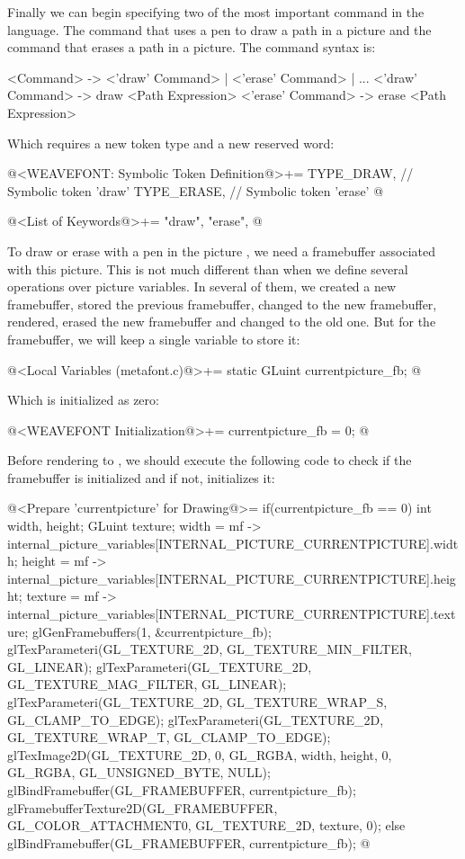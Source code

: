 {{{{{Finally we can begin specifying two of the most important command in
the language. The command that uses a pen to draw a path in a picture
and the command that erases a path in a picture. The command syntax
is:

\alinhaverbatim
<Command> -> <'draw' Command> | <'erase' Command> | ...
<'draw' Command> -> draw <Path Expression>
<'erase' Command> -> erase <Path Expression>
\alinhanormal

Which requires a new token type and a new reserved word:

\iniciocodigo
@<WEAVEFONT: Symbolic Token Definition@>+=
TYPE_DRAW,  // Symbolic token 'draw'
TYPE_ERASE, // Symbolic token 'erase'
@
\fimcodigo

\iniciocodigo
@<List of Keywords@>+=
"draw", "erase",
@
\fimcodigo



To draw or erase with a pen in the
picture , we need a framebuffer associated
with this picture. This is not much different than when we define
several operations over picture variables. In several of them, we
created a new framebuffer, stored the previous framebuffer, changed to
the new framebuffer, rendered, erased the new framebuffer and changed
to the old one. But for the  framebuffer,
we will keep a single variable to store it:

\iniciocodigo
@<Local Variables (metafont.c)@>+=
static GLuint currentpicture_fb;
@
\fimcodigo

Which is initialized as zero:

\iniciocodigo
@<WEAVEFONT Initialization@>+=
currentpicture_fb = 0;
@
\fimcodigo

Before rendering to , we should execute the
following code to check if the framebuffer is initialized and if not,
initializes it:

\iniciocodigo
@<Prepare 'currentpicture' for Drawing@>=
{
  if(currentpicture_fb == 0){
    int width, height;
    GLuint texture;
    width = mf ->
             internal_picture_variables[INTERNAL_PICTURE_CURRENTPICTURE].width;
    height = mf ->
            internal_picture_variables[INTERNAL_PICTURE_CURRENTPICTURE].height;
    texture = mf ->
           internal_picture_variables[INTERNAL_PICTURE_CURRENTPICTURE].texture;
    glGenFramebuffers(1, &currentpicture_fb);
    glTexParameteri(GL_TEXTURE_2D, GL_TEXTURE_MIN_FILTER, GL_LINEAR);
    glTexParameteri(GL_TEXTURE_2D, GL_TEXTURE_MAG_FILTER, GL_LINEAR);
    glTexParameteri(GL_TEXTURE_2D, GL_TEXTURE_WRAP_S, GL_CLAMP_TO_EDGE);
    glTexParameteri(GL_TEXTURE_2D, GL_TEXTURE_WRAP_T, GL_CLAMP_TO_EDGE);
    glTexImage2D(GL_TEXTURE_2D, 0, GL_RGBA, width, height, 0, GL_RGBA,
                 GL_UNSIGNED_BYTE, NULL);
    glBindFramebuffer(GL_FRAMEBUFFER, currentpicture_fb);
    glFramebufferTexture2D(GL_FRAMEBUFFER, GL_COLOR_ATTACHMENT0, GL_TEXTURE_2D,
                           texture, 0);
  }
  else
    glBindFramebuffer(GL_FRAMEBUFFER, currentpicture_fb);
}
@
\fimcodigo

}}}}}
